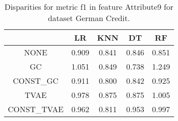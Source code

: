 \begin{table}
\caption{Disparities for metric f1 in feature Attribute9 for dataset German Credit.}
\label{tab:disp-GERMAN CREDIT-Attribute9-f1}
\begin{tabular}{ccccc}
\toprule
 & LR & KNN & DT & RF \\
\midrule
NONE & 0.909 & 0.841 & 0.846 & 0.851 \\
GC & 1.051 & 0.849 & 0.738 & 1.249 \\
CONST\_GC & 0.911 & 0.800 & 0.842 & 0.925 \\
TVAE & 0.978 & 0.875 & 0.875 & 1.005 \\
CONST\_TVAE & 0.962 & 0.811 & 0.953 & 0.997 \\
\bottomrule
\end{tabular}
\end{table}
